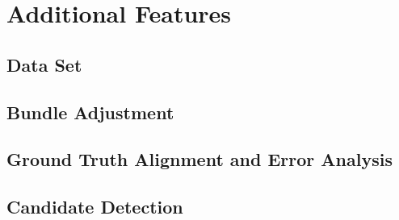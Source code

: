 \chapter{Additional Features}
\section{Data Set}
\label{dataset}

\section{Bundle Adjustment}
\label{bundle adjustment}

\section{Ground Truth Alignment and Error Analysis}
\label{simulation}

\section{Candidate Detection}